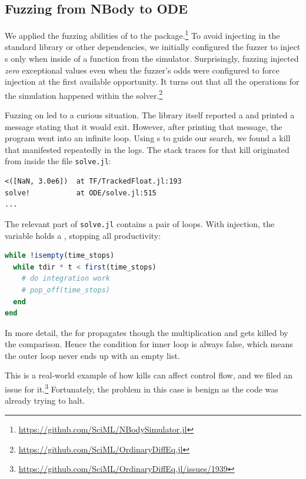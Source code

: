 \documentclass{juliacon}
\begin{document}
\subsection{Fuzzing from NBody to ODE}
\label{s:ode}

We applied the fuzzing abilities of \TF{} to the
\NBodySimulator{} package.\footnote{\url{https://github.com/SciML/NBodySimulator.jl}}
To avoid injecting in the standard library or other dependencies,
we initially configured the fuzzer to inject \NaN{}s {only} when inside of a
function from the simulator.
Surprisingly, fuzzing injected \emph{zero} exceptional values even
when the fuzzer's odds were configured to force injection at the
first available opportunity.
It turns out that all the \fp{} operations for the simulation happened
within the \OrdinaryDiffEq{}
solver.\footnote{\url{https://github.com/SciML/OrdinaryDiffEq.jl}}

Fuzzing on \OrdinaryDiffEq{} led to a curious situation.
The library itself reported a \NaN{} and printed a message stating that it would exit.
However, after printing that message, the program went into an infinite loop.
Using \CSTG{}s to guide our search, we found a \NaN{} kill that manifested repeatedly in the logs.
The stack traces for that kill originated from inside the file \texttt{solve.jl}:

\begin{lstlisting}
<([NaN, 3.0e6])  at TF/TrackedFloat.jl:193
solve!           at ODE/solve.jl:515
...
\end{lstlisting}

The relevant part of \texttt{solve.jl} contains a pair of loops.
With injection, the variable  holds a \NaN{},
stopping all productivity:


\begin{lstlisting}[language = Julia]
while !isempty(time_stops)
  while tdir * t < first(time_stops)
    # do integration work
    # pop_off(time_stops)
  end
end
\end{lstlisting}

In more detail, the \NaN{} for  propagates though the multiplication
and gets killed by the \code{<} comparison.
Hence the condition for inner  loop is always false,
which means the outer loop never ends up with an empty list.

This is a real-world example of how \NaN{} kills can affect control flow, and we filed
an issue for it.\footnote{\url{https://github.com/SciML/OrdinaryDiffEq.jl/issues/1939}}
Fortunately, the problem in this case is benign as the code was already trying to halt.
\end{document}
